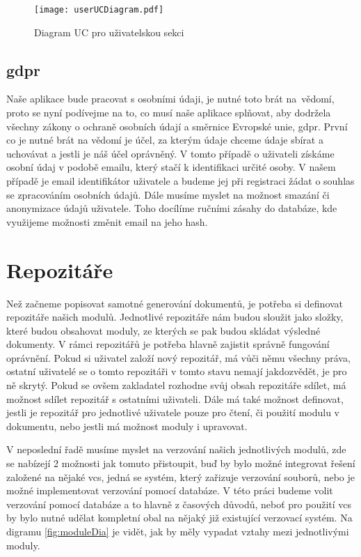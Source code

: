 \begin{figure}[h]
    \centering
    \texttt{[image: userUCDiagram.pdf]}
    \caption{Diagram UC pro uživatelskou sekci}
    \label{fig:userUCDiagram}
\end{figure}

\subsection{\gls{gdpr}}

Naše aplikace bude pracovat s osobními údaji, je nutné toto brát na~vědomí, proto se nyní podívejme na to, co musí naše aplikace splňovat, aby dodržela všechny
zákony o ochraně osobních údají a směrnice Evropské unie, \gls{gdpr}. První co je nutné brát na vědomí je účel, za kterým údaje chceme údaje sbírat a uchovávat a jestli je náš
účel oprávněný. V tomto případě o uživateli získáme osobní údaj v podobě emailu, který stačí k identifikaci určité osoby. V našem případě je email identifikátor uživatele
a budeme jej při registraci žádat o souhlas se zpracováním osobních údajů. Dále musíme myslet na možnost smazání či anonymizace údajů uživatele. Toho docílíme ručními
zásahy do databáze, kde využijeme možnosti změnit email na jeho hash. \cite{gdpr}

\section{Repozitáře}

Než začneme popisovat samotné generování dokumentů, je potřeba si \mbox{definovat} repozitáře našich modulů. Jednotlivé repozitáře nám budou sloužit jako složky,
které budou obsahovat moduly, ze kterých se pak budou skládat výsledné dokumenty. V rámci repozitářů je potřeba hlavně zajistit správně fungování oprávnění.
Pokud si uživatel založí nový repozitář, má vůči němu všechny práva, ostatní uživatelé se o tomto repozitáři v tomto stavu nemají jak\linebreak dozvědět, je pro ně
skrytý. Pokud se ovšem zakladatel rozhodne svůj obsah repozitáře sdílet, má možnost sdílet repozitář s ostatními uživateli.
Dále má také možnost definovat, jestli je repozitář pro jednotlivé uživatele pouze pro čtení, či použití modulu v dokumentu,
nebo jestli má možnost moduly i upravovat.

V neposlední řadě musíme myslet na verzování našich jednotlivých modulů, zde se nabízejí 2 možnosti jak tomuto přistoupit, buď by bylo možné integrovat
řešení založené na nějaké \gls{vcs}, jedná se systém, který zařizuje verzování souborů,
nebo je možné implementovat verzování pomocí databáze. V této práci budeme volit verzování pomocí databáze a to hlavně z časových důvodů, neboť
pro použití vcs by bylo nutné udělat kompletní obal na nějaký již existující verzovací systém. Na digramu \ref{fig:moduleDia} je vidět, jak by měly
vypadat vztahy mezi jednotlivými moduly.

